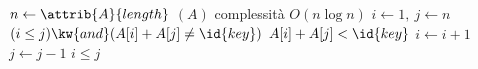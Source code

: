 \begin{codebox}
\li	$n \gets \attrib{A}{length}$
\li	{}$(A)$
		\Comment complessità $O(n \log n)$
\li	$i \gets 1, \ j \gets n$
\li \While $(i \leq j) \kw{ and } (A[i] + A[j] \neq \id{key})$
\li 	\Do
			\If $A[i] + A[j] < \id{key}$
\li				\Then
					$i \gets i + 1$
\li				\Else
\li					$j \gets j - 1$
				\End
		\End
\li	\Return $i \leq j$	
\end{codebox}